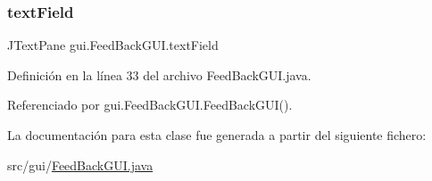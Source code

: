 \subsubsection{\texorpdfstring{textField}{textField}}
{\footnotesize\ttfamily J\+Text\+Pane gui.\+Feed\+Back\+G\+U\+I.\+text\+Field\hspace{0.3cm}{\ttfamily [private]}}



Definición en la línea 33 del archivo Feed\+Back\+G\+U\+I.\+java.



Referenciado por gui.\+Feed\+Back\+G\+U\+I.\+Feed\+Back\+G\+U\+I().



La documentación para esta clase fue generada a partir del siguiente fichero\+:\begin{DoxyCompactItemize}
\item 
src/gui/\mbox{\hyperlink{_feed_back_g_u_i_8java}{Feed\+Back\+G\+U\+I.\+java}}\end{DoxyCompactItemize}
